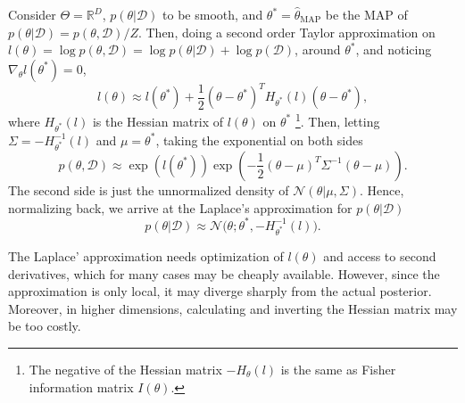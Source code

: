 Consider $\Theta = \mathbb{R}^D$, $p(\theta|\mathcal{D})$ to be smooth, and $\theta^* = \hat{\theta}_{\text{MAP}}$ be the MAP of $p(\theta|\mathcal{D}) = p(\theta,\mathcal{D})/Z$. Then, doing a second order Taylor approximation on $l(\theta) = \log p(\theta,\mathcal{D}) = \log p(\theta|\mathcal{D}) + \log p(\mathcal{D})$, around $\theta^*$, and noticing $\nabla_\theta l(\theta^*) = 0$, 
\begin{equation}
 l(\theta) \approx l(\theta^*) + \frac{1}{2} (\theta - \theta^*)^T H_{\theta^*}(l) (\theta - \theta^*),
\end{equation}
where $H_{\theta^*}(l)$ is the Hessian matrix of $l(\theta)$ on $\theta^*$ \footnote{The negative of the Hessian matrix $-H_{\theta}(l)$ is the same as Fisher information matrix $I(\theta)$.}. Then, letting $\Sigma = -H_{\theta^*}^{-1}(l)$ and $\mu = \theta^*$, taking the exponential on both sides 
\begin{equation}
p(\theta,\mathcal{D}) \approx \exp(l(\theta^*)) \exp \left(-\frac{1}{2}(\theta - \mu)^T \Sigma^{-1} (\theta - \mu) \right).
\end{equation}
The second side is just the unnormalized density of $\mathcal{N}(\theta|\mu,\Sigma)$. Hence, normalizing back, we arrive at the Laplace's approximation for $p(\theta|\mathcal{D})$
\begin{equation}
p(\theta|\mathcal{D}) \approx \mathcal{N}\big(\theta;\theta^*,-H_{\theta^*}^{-1} (l)\big).
\end{equation}

The Laplace' approximation needs optimization of $l(\theta)$ and access to second derivatives, which for many cases may be cheaply available. However, since the approximation is only local, it may diverge sharply from the actual posterior. Moreover, in higher dimensions, calculating and inverting the Hessian matrix may be too costly.


